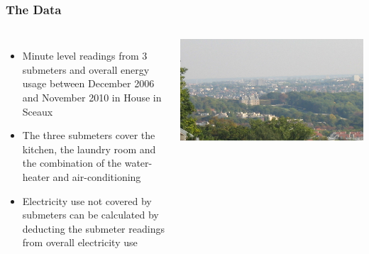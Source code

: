 \documentclass[10pt]{beamer}
\begin{document}
\begin{frame}
\frametitle{The Data}

\begin{columns}[c] %


\begin{itemize}
    \item Minute level readings from 3 submeters and overall energy usage between December 2006 and November 2010 in House in Sceaux
    \item The three submeters cover the kitchen, the laundry room and the combination of the water-heater and air-conditioning
    \item Electricity use not covered by submeters can be calculated by deducting the submeter readings from overall electricity use
\end{itemize}


\bigskip
{
    \centering
    \includegraphics[width=\textwidth,height=\textheight,keepaspectratio]{sceaux.jpg}
    \par
}
\bigskip

\end{columns}

\end{frame}

\end{document}
